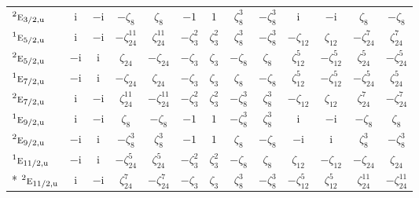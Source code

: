 \documentclass[10pt,a4paper]{article}
\numberwithin{equation}{section}
\newcommand{\irr}[1]{\text{\normalfont\scshape #1}}
\newcommand{\conjpair}[1]{{}^{#1}}
\newcommand{\ptag}[1]{\mathrm{#1}}
\newcommand{\iunit}{\mathrm{i}}
\newcommand{\rootunity}[1]{\zeta_{#1}}
\begin{document}
{\begin{longtable}{@{}lcccccccccccc@{}}
$\conjpair{2}\irr{e}_{3/2,\ptag{u}}$ & $\iunit{}$ & $-\iunit{}$ & $-\rootunity{8}$ & $\rootunity{8}$ & $-1$ & $1$ & $\rootunity{8}^{3}$ & $-\rootunity{8}^{3}$ & $\iunit{}$ & $-\iunit{}$ & $\rootunity{8}$ & $-\rootunity{8}$\\
$\conjpair{1}\irr{e}_{5/2,\ptag{u}}$ & $\iunit{}$ & $-\iunit{}$ & $-\rootunity{24}^{11}$ & $\rootunity{24}^{11}$ & $-\rootunity{3}^{2}$ & $\rootunity{3}^{2}$ & $\rootunity{8}^{3}$ & $-\rootunity{8}^{3}$ & $-\rootunity{12}$ & $\rootunity{12}$ & $-\rootunity{24}^{7}$ & $\rootunity{24}^{7}$\\
$\conjpair{2}\irr{e}_{5/2,\ptag{u}}$ & $-\iunit{}$ & $\iunit{}$ & $\rootunity{24}$ & $-\rootunity{24}$ & $-\rootunity{3}$ & $\rootunity{3}$ & $-\rootunity{8}$ & $\rootunity{8}$ & $\rootunity{12}^{5}$ & $-\rootunity{12}^{5}$ & $\rootunity{24}^{5}$ & $-\rootunity{24}^{5}$\\
$\conjpair{1}\irr{e}_{7/2,\ptag{u}}$ & $-\iunit{}$ & $\iunit{}$ & $-\rootunity{24}$ & $\rootunity{24}$ & $-\rootunity{3}$ & $\rootunity{3}$ & $\rootunity{8}$ & $-\rootunity{8}$ & $\rootunity{12}^{5}$ & $-\rootunity{12}^{5}$ & $-\rootunity{24}^{5}$ & $\rootunity{24}^{5}$\\
$\conjpair{2}\irr{e}_{7/2,\ptag{u}}$ & $\iunit{}$ & $-\iunit{}$ & $\rootunity{24}^{11}$ & $-\rootunity{24}^{11}$ & $-\rootunity{3}^{2}$ & $\rootunity{3}^{2}$ & $-\rootunity{8}^{3}$ & $\rootunity{8}^{3}$ & $-\rootunity{12}$ & $\rootunity{12}$ & $\rootunity{24}^{7}$ & $-\rootunity{24}^{7}$\\
$\conjpair{1}\irr{e}_{9/2,\ptag{u}}$ & $\iunit{}$ & $-\iunit{}$ & $\rootunity{8}$ & $-\rootunity{8}$ & $-1$ & $1$ & $-\rootunity{8}^{3}$ & $\rootunity{8}^{3}$ & $\iunit{}$ & $-\iunit{}$ & $-\rootunity{8}$ & $\rootunity{8}$\\
$\conjpair{2}\irr{e}_{9/2,\ptag{u}}$ & $-\iunit{}$ & $\iunit{}$ & $-\rootunity{8}^{3}$ & $\rootunity{8}^{3}$ & $-1$ & $1$ & $\rootunity{8}$ & $-\rootunity{8}$ & $-\iunit{}$ & $\iunit{}$ & $\rootunity{8}^{3}$ & $-\rootunity{8}^{3}$\\
$\conjpair{1}\irr{e}_{11/2,\ptag{u}}$ & $-\iunit{}$ & $\iunit{}$ & $-\rootunity{24}^{5}$ & $\rootunity{24}^{5}$ & $-\rootunity{3}^{2}$ & $\rootunity{3}^{2}$ & $-\rootunity{8}$ & $\rootunity{8}$ & $\rootunity{12}$ & $-\rootunity{12}$ & $-\rootunity{24}$ & $\rootunity{24}$\\*
$\conjpair{2}\irr{e}_{11/2,\ptag{u}}$ & $\iunit{}$ & $-\iunit{}$ & $\rootunity{24}^{7}$ & $-\rootunity{24}^{7}$ & $-\rootunity{3}$ & $\rootunity{3}$ & $\rootunity{8}^{3}$ & $-\rootunity{8}^{3}$ & $-\rootunity{12}^{5}$ & $\rootunity{12}^{5}$ & $\rootunity{24}^{11}$ & $-\rootunity{24}^{11}$\\
\bottomrule\end{longtable}}
\end{document}
